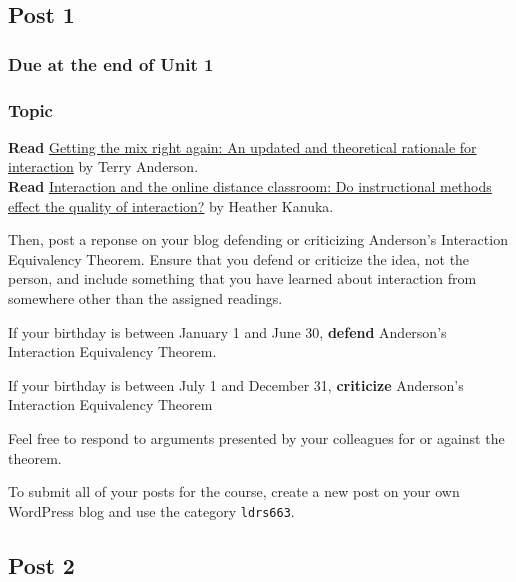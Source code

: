 \documentclass[
]{book}
\begin{document}
\hypertarget{post-1}{%
\subsection*{Post 1}\label{post-1}}

\hypertarget{due-at-the-end-of-unit-1}{%
\subsubsection*{Due at the end of Unit 1}\label{due-at-the-end-of-unit-1}}

\hypertarget{topic}{%
\subsubsection*{Topic}\label{topic}}

\textbf{Read} \href{https://www.irrodl.org/index.php/irrodl/article/view/149/230}{Getting the mix right again: An updated and theoretical rationale for interaction} by Terry Anderson.\\
\textbf{Read} \href{https://link-springer-com.ezproxy.student.twu.ca/article/10.1007/s12528-011-9049-4}{Interaction and the online distance classroom: Do instructional methods effect the quality of interaction?} by Heather Kanuka.

Then, post a reponse on your blog defending or criticizing Anderson's Interaction Equivalency Theorem. Ensure that you defend or criticize the idea, not the person, and include something that you have learned about interaction from somewhere other than the assigned readings.

If your birthday is between January 1 and June 30, \textbf{defend} Anderson's Interaction Equivalency Theorem.

If your birthday is between July 1 and December 31, \textbf{criticize} Anderson's Interaction Equivalency Theorem

Feel free to respond to arguments presented by your colleagues for or against the theorem.

To submit all of your posts for the course, create a new post on your own WordPress blog and use the category \texttt{ldrs663}.

\hypertarget{post-2}{%
\subsection*{Post 2}\label{post-2}}
\end{document}
